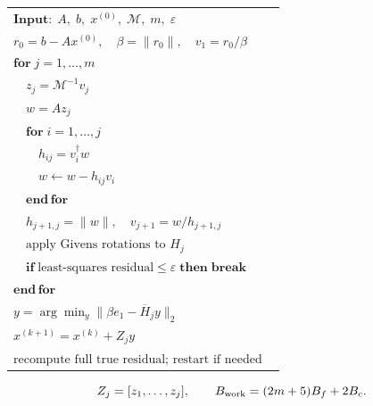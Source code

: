 \documentclass[border=7pt,12pt]{standalone}
\begin{document}
\begin{minipage}{30cm}
\begin{minipage}[t]{14.2cm}
\begin{tabular}{@{}>{\raggedright\arraybackslash}p{0.96\linewidth}@{}}
\toprule
\(\mathbf{Input:}\; A,\;b,\;x^{(0)},\;\mathcal M,\;m,\;\varepsilon\)\\
\(r_0=b-Ax^{(0)},\quad \beta=\|r_0\|,\quad
 v_1=r_0/\beta\)\\
\(\mathbf{for}\;j=1,\ldots,m\)\\
\(\quad z_j=\mathcal M^{-1}v_j\)\\
\(\quad w=A z_j\)\\
\(\quad \mathbf{for}\;i=1,\ldots,j\)\\
\(\quad\quad h_{ij}=v_i^\dagger w\)\\
\(\quad\quad w\leftarrow w-h_{ij}v_i\)\\
\(\quad \mathbf{end\,for}\)\\
\(\quad h_{j+1,j}=\|w\|,\quad
 v_{j+1}=w/h_{j+1,j}\)\\
\(\quad \text{apply Givens rotations to }H_j\)\\
\(\quad \mathbf{if}\;\text{least-squares residual}
 \le\varepsilon\;\mathbf{then\;break}\)\\
\(\mathbf{end\,for}\)\\
\(y=\arg\min_y\|\beta e_1-\overline H_jy\|_2\)\\
\(x^{(k+1)}=x^{(k)}+Z_jy\)\\
\(\text{recompute full true residual; restart if needed}\)\\
\bottomrule
\end{tabular}

\vspace{0.75em}
\[
Z_j=[z_1,\ldots,z_j],\qquad
B_{\rm work}=(2m+5)B_f+2B_c.
\]
\end{minipage}
\end{minipage}
\end{document}
